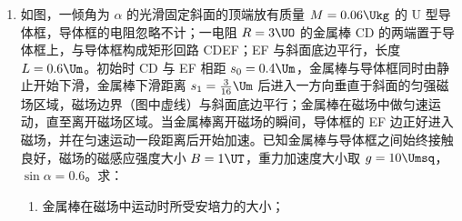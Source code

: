 \documentclass[\gkver]{gaokaozhenti}
\begin{document}
\begin{enumerate}
\begin{enumerate}
	\item
	运动员拍球过程中对篮球所做的功；

	\item
	运动员拍球时对篮球的作用力的大小。

\end{enumerate}


\item
如图，一倾角为 $\alpha$ 的光滑固定斜面的顶端放有质量 $M=0.06\Ukg$ 的 U 型导体框，导体框的电阻忽略不计；一电阻 $R=3\UO$ 的金属棒 CD 的两端置于导体框上，与导体框构成矩形回路 CDEF；EF 与斜面底边平行，长度 $L=0.6\Um$。初始时 CD 与 EF 相距 $s_{0}=0.4\Um$，金属棒与导体框同时由静止开始下滑，金属棒下滑距离 $s_{1}=\frac{3}{16}\Um$ 后进入一方向垂直于斜面的匀强磁场区域，磁场边界（图中虚线）与斜面底边平行；金属棒在磁场中做匀速运动，直至离开磁场区域。当金属棒离开磁场的瞬间，导体框的 EF 边正好进入磁场，并在匀速运动一段距离后开始加速。已知金属棒与导体框之间始终接触良好，磁场的磁感应强度大小 $B=1\UT$，重力加速度大小取 $g=10\Umsq$，$\sin\alpha=0.6$。求：

\begin{enumerate}
	\item
	金属棒在磁场中运动时所受安培力的大小；


\end{enumerate}
\end{enumerate}
\end{document}
